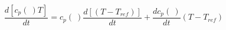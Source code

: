 \begin{equation}
\frac{d [c_p(\ ) T]}{dt} =c_p(\ ) \frac{d [ (T- T_{ref})]}{dt} + \frac{d c_p(\ )}{dt} (T- T_{ref})
\end{equation}